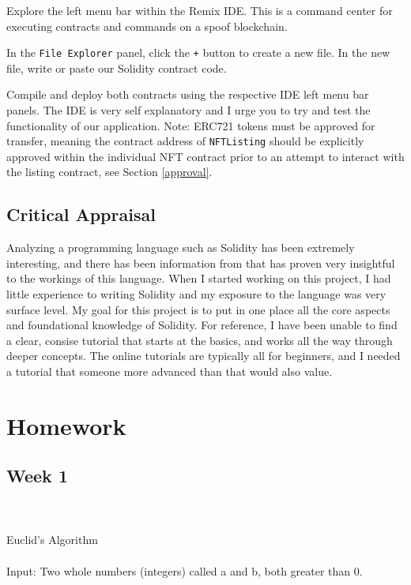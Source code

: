 \documentclass{article}
\theoremstyle{theorem}
\theoremstyle{definition}
\theoremstyle{remark}
\begin{document}
\medskip\noindent
Explore the left menu bar within the Remix IDE. This is a command center for executing contracts and commands on a spoof blockchain. 

\medskip\noindent
In the \texttt{File Explorer} panel, click the \texttt{+} button to create a new file. In the new file, write or paste our Solidity contract code. 

\medskip\noindent
Compile and deploy both contracts using the respective IDE left menu bar panels. The IDE is very self explanatory and I urge you to try and test the functionality of our application. Note: ERC721 tokens must be approved for transfer, meaning the contract address of \texttt{NFTListing} should be explicitly approved within the individual NFT contract prior to an attempt to interact with the listing contract, see Section \ref{approval}.

\medskip\noindent

\subsection{Critical Appraisal}

Analyzing a programming language such as Solidity has been extremely interesting, and there has been information from \cite{PL} that has proven very insightful to the workings of this language. When I started working on this project, I had little experience to writing Solidity and my exposure to the language was very surface level. My goal for this project is to put in one place all the core aspects and foundational knowledge of Solidity. For reference, I have been unable to find a clear, consise tutorial that starts at the basics, and works all the way through deeper concepts. The online tutorials are typically all for beginners, and I needed a tutorial that someone more advanced than that would also value.

\section{Homework}\label{homework}

\subsection{Week 1}

{\large \\\\Euclid's Algorithm\\\\}
Input: Two whole numbers (integers) called a and b, both greater than 0.
\end{document}
